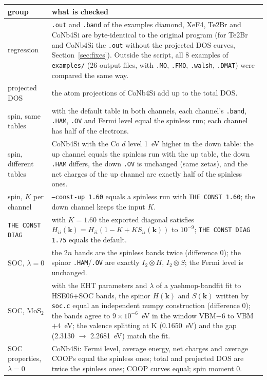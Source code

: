 \documentclass[11pt,a4paper]{article}
\newcommand{\file}[1]{\texttt{#1}}
\newcommand{\opt}[1]{\texttt{#1}}
\begin{document}
\begin{longtable}{p{4.2cm} p{10.6cm}}
\toprule
\textbf{group} & \textbf{what is checked} \\
\midrule
\endhead
regression & \texttt{.out} and \texttt{.band} of the examples diamond, XeF4, Te2Br and
CoNb4Si are byte-identical to the original program (for Te2Br and CoNb4Si the
\texttt{.out} without the projected DOS curves, Section~\ref{sec:fixes}). Outside the
script, all 8 examples of \file{examples/} (26 output files, with \texttt{.MO},
\texttt{.FMO}, \texttt{.walsh}, \texttt{.DMAT}) were compared the same way. \\
projected DOS & the atom projections of CoNb4Si add up to the total DOS. \\
spin, same tables & with the default table in both channels, each channel's
\texttt{.band}, \texttt{.HAM}, \texttt{.OV} and Fermi level equal the spinless run; each
channel has half of the electrons. \\
spin, different tables & CoNb4Si with the Co $d$ level 1~eV higher in the down table: the
up channel equals the spinless run with the up table, the down \texttt{.HAM} differs, the
down \texttt{.OV} is unchanged (same zetas), and the net charges of the up channel are
exactly half of the spinless ones. \\
spin, $K$ per channel & \opt{--const-up 1.60} equals a spinless run with
\texttt{THE CONST 1.60}; the down channel keeps the input $K$. \\
\texttt{THE CONST DIAG} & with $K=1.60$ the exported diagonal satisfies
$H_{ii}(\mathbf{k})=H_{ii}(1-K+KS_{ii}(\mathbf{k}))$ to $10^{-9}$; \texttt{THE CONST DIAG
1.75} equals the default. \\
SOC, $\lambda=0$ & the $2n$ bands are the spinless bands twice (difference 0); the
spinor \texttt{.HAM}/\texttt{.OV} are exactly $I_2\otimes H$, $I_2\otimes S$; the Fermi
level is unchanged. \\
SOC, MoS$_2$ & with the EHT parameters and $\lambda$ of a yaehmop-bandfit fit to HSE06+SOC
bands, the spinor $H(\mathbf{k})$ and $S(\mathbf{k})$ written by \file{soc.c} equal an
independent numpy construction (difference 0); the bands agree to $9\times10^{-6}$~eV in
the window VBM$-6$ to VBM$+4$~eV; the valence splitting at K (0.1650~eV) and the gap
(2.3130 $\to$ 2.2681~eV) match the fit. \\
SOC properties, $\lambda=0$ & CoNb4Si: Fermi level, average energy, net charges and
average COOPs equal the spinless ones; total and projected DOS are twice the spinless
ones; COOP curves equal; spin moment 0. \\

\end{longtable}
\end{document}
